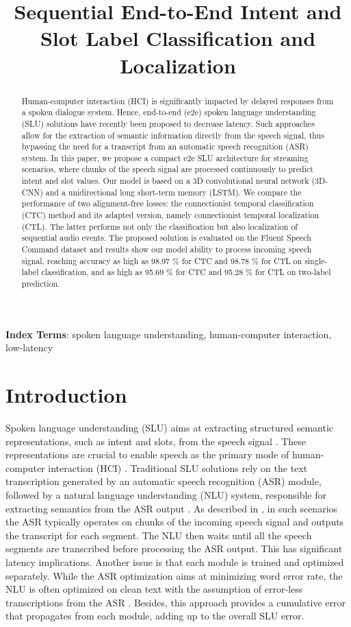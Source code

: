 \documentclass[a4paper]{article}
\title{Sequential End-to-End Intent and Slot Label Classification and Localization}
\begin{document}
\maketitle
\begin{abstract}
Human-computer interaction (HCI) is significantly impacted by delayed responses from a spoken dialogue system. Hence, end-to-end (e2e) spoken language understanding (SLU) solutions have recently been proposed to decrease latency. Such approaches allow for the extraction of semantic information directly from the speech signal, thus bypassing the need for a transcript from an automatic speech recognition (ASR) system. In this paper, we propose a compact e2e SLU architecture for streaming scenarios, where chunks of the speech signal are processed continuously to predict intent and slot values. Our model is based on a 3D convolutional neural network (3D-CNN) and a unidirectional long short-term memory (LSTM). We compare the performance of two alignment-free losses: the connectionist temporal classification (CTC) method and its adapted version, namely connectionist temporal localization (CTL). The latter performs not only the classification but also localization of sequential audio events. The proposed solution is evaluated on the Fluent Speech Command dataset and results show our model ability to process incoming speech signal, reaching accuracy as high as 98.97 \% for CTC and 98.78 \% for CTL on single-label classification, and as high as 95.69 \% for CTC and 95.28 \% for CTL on two-label prediction.

\end{abstract}
\noindent\textbf{Index Terms}: spoken language understanding, human-computer interaction, low-latency

\section{Introduction}

Spoken language understanding (SLU) aims at extracting structured semantic representations, such as intent and slots, from the speech signal \cite{mhiri2020low}. These representations are crucial to enable speech as the primary mode of human-computer interaction (HCI) \cite{he2019streaming}. Traditional SLU solutions rely on the text transcription generated by an automatic speech recognition (ASR) module, followed by a natural language understanding (NLU) system, responsible for extracting semantics from the ASR output \cite{qian2019spoken}. As described in \cite{shivakumar2019incremental}, in such scenarios the ASR typically operates on chunks of the incoming speech signal and outputs the transcript for each segment. The NLU then waits until all the speech segments are transcribed before processing the ASR output. This has significant latency implications. Another issue is that each module is trained and optimized separately. While the ASR optimization aims at minimizing word error rate, the NLU is often optimized on clean text with the assumption of error-less transcriptions from the ASR \cite{serdyuk2018towards}. Besides, this approach provides a cumulative error that propagates from each module, adding up to the overall SLU error.
\end{document}
